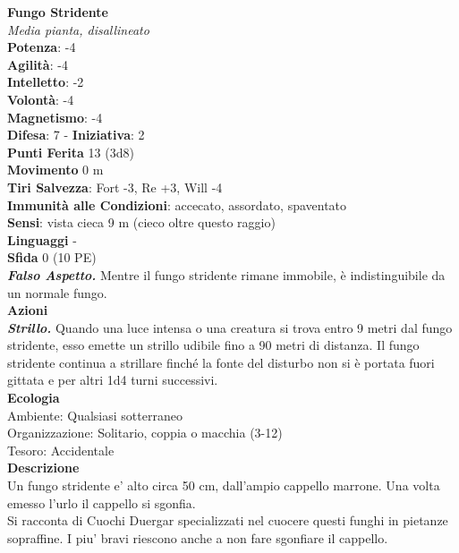 \begin{multicols}{2}
\medskip\textbf{Fungo Stridente}\\
\emph{Media pianta, disallineato}\\
\textbf{Potenza}: -4\\
\textbf{Agilità}: -4\\
\textbf{Intelletto}: -2\\
\textbf{Volontà}: -4\\
\textbf{Magnetismo}: -4\\
\textbf{Difesa}: 7 - \textbf{Iniziativa}: 2\\
\textbf{Punti Ferita} 13 (3d8)\\
\textbf{Movimento} 0 m\\
\textbf{Tiri Salvezza}: Fort -3, Re +3, Will -4\\
\textbf{Immunità alle Condizioni}: accecato, assordato, spaventato\\
\textbf{Sensi}: vista cieca 9 m (cieco oltre questo raggio)\\
\textbf{Linguaggi} -\\
\textbf{Sfida} 0 (10 PE)\smallskip\\
\emph{\textbf{Falso Aspetto.}} Mentre il fungo stridente rimane immobile, è indistinguibile da un normale fungo.\\
\smallskip\textbf{Azioni}\\
\emph{\textbf{Strillo.}} Quando una luce intensa o una creatura si trova entro 9 metri dal fungo stridente, esso emette un strillo udibile fino a 90 metri di distanza. Il fungo stridente continua a strillare finché la fonte del disturbo non si è portata fuori gittata e per altri 1d4 turni successivi.\\
\textbf{Ecologia}\\
Ambiente: Qualsiasi sotterraneo\\
Organizzazione: Solitario, coppia o macchia (3-12)\\
Tesoro: Accidentale\\
\textbf{Descrizione}\\
Un fungo stridente e' alto circa 50 cm, dall'ampio cappello marrone. Una volta emesso l'urlo il cappello si sgonfia. \\
Si racconta di Cuochi Duergar specializzati nel cuocere questi funghi in pietanze sopraffine.
I piu' bravi riescono anche a non fare sgonfiare il cappello.\\


\end{multicols}
